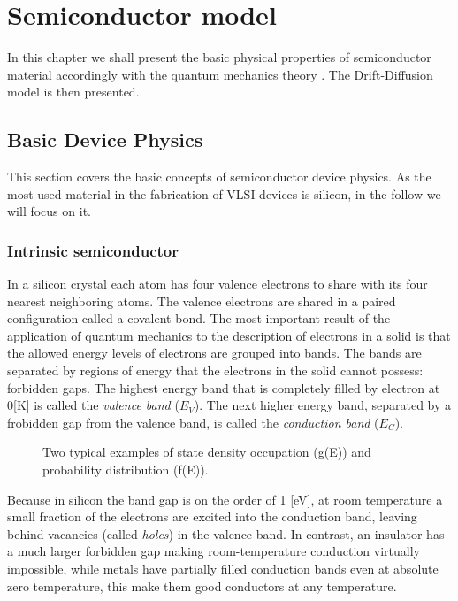 \chapter{Semiconductor model}

In this chapter we shall present the basic physical properties of semiconductor material accordingly with the quantum mechanics theory \citep{ModernVLSIdevices}. The Drift-Diffusion model is then presented.

\section{Basic Device Physics}

This section covers the basic concepts of semiconductor device physics. As the most used material in the fabrication of VLSI devices is silicon, in the follow we will focus on it.

\subsection{Intrinsic semiconductor}
In a silicon crystal each atom has four valence electrons to share with its four nearest neighboring atoms. The valence electrons are shared in a paired configuration called a covalent bond. The most important result of the application of quantum mechanics to the description of electrons in a solid is that the allowed energy levels of electrons are grouped into bands. The bands are separated by regions of energy that the electrons in the solid cannot possess: forbidden gaps. The highest energy band that is completely filled by electron at 0[K] is called the \textit{valence band} ($E_V$). The next higher energy band, separated by a frobidden gap from the valence band, is called the \textit{conduction band} ($E_C$).

\begin{figure}[!h]
\centering
{}
\caption{Two typical examples of state density occupation (g(E)) and probability distribution (f(E)).  }
\end{figure}

Because in silicon the band gap is on the order of 1 [eV], at room temperature a small fraction of the electrons are excited into the conduction band, leaving behind vacancies (called \textit{holes}) in the valence band.
In contrast, an insulator has a much larger forbidden gap making room-temperature conduction virtually impossible, while metals have partially filled conduction bands even at absolute zero temperature, this make them good conductors at any temperature. 

